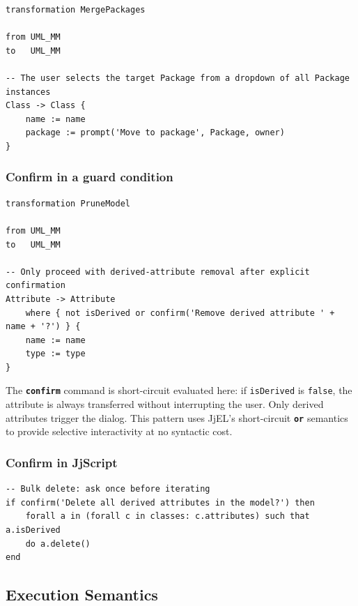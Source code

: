 \documentclass[11pt,a4paper]{article}
\newcommand{\jjel}{\textsf{JjEL}}
\newcommand{\kw}[1]{\texttt{\textbf{#1}}}
\begin{document}
\begin{lstlisting}[style=jjtl,caption={JjModal prompt with MetaclassRef type}]
transformation MergePackages
 
from UML_MM
to   UML_MM
 
-- The user selects the target Package from a dropdown of all Package instances
Class -> Class {
    name := name
    package := prompt('Move to package', Package, owner)
}
\end{lstlisting}
 
\subsubsection{Confirm in a guard condition}
 
\begin{lstlisting}[style=jjtl,caption={JjModal confirm as a guard}]
transformation PruneModel
 
from UML_MM
to   UML_MM
 
-- Only proceed with derived-attribute removal after explicit confirmation
Attribute -> Attribute
    where { not isDerived or confirm('Remove derived attribute ' + name + '?') } {
    name := name
    type := type
}
\end{lstlisting}
 
The \kw{confirm} command is short-circuit evaluated here: if
\texttt{isDerived} is \texttt{false}, the attribute is always transferred
without interrupting the user. Only derived attributes trigger the dialog.
This pattern uses \jjel{}'s short-circuit \kw{or} semantics to provide
selective interactivity at no syntactic cost.
 
\subsubsection{Confirm in JjScript}
 
\begin{lstlisting}[style=jjel,caption={JjModal confirm in a JjScript block}]
-- Bulk delete: ask once before iterating
if confirm('Delete all derived attributes in the model?') then
    forall a in (forall c in classes: c.attributes) such that a.isDerived
    do a.delete()
end
\end{lstlisting}
 
\subsection{Execution Semantics}\label{sec:jjmodal-exec}
 
\end{document}
